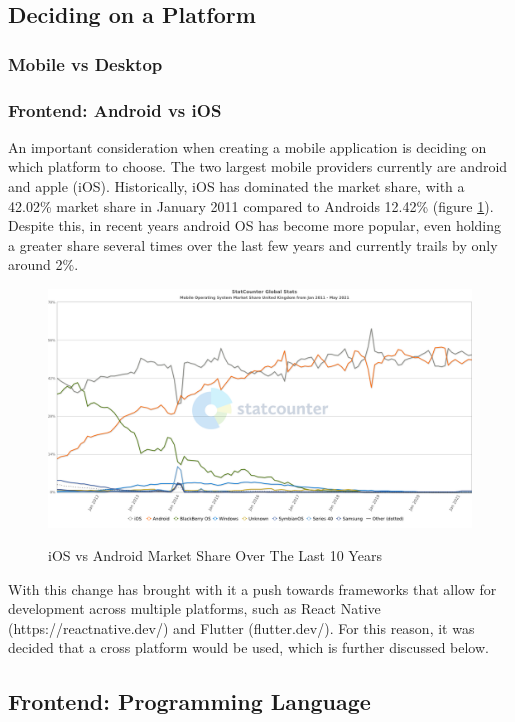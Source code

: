 \documentclass[12pt]{article}
\begin{document}
	\subsection{Deciding on a Platform}
	\subsubsection{Mobile vs Desktop}
	
	\subsubsection{Frontend: Android vs iOS}
	An important consideration when creating a mobile application is deciding on which platform to choose. The two largest mobile providers currently are android and apple (iOS). Historically, iOS has dominated the market share, with a 42.02\% market share in January 2011 compared to Androids 12.42\% (figure \ref{fig:ios-android}). Despite this, in recent years android OS has become more popular, even holding a greater share several times over the last few years and currently trails by only around 2\%.
	
	\begin{figure}[H]
		\centering
		\includegraphics[scale=0.4]{images/ios-android.png}
		\caption{iOS vs Android Market Share Over The Last 10 Years}
		\label{fig:ios-android}
		\cite{stat-counter-21}
	\end{figure}
	
	With this change has brought with it a push towards frameworks that allow for development across multiple platforms, such as React Native (https://reactnative.dev/) and Flutter (flutter.dev/). For this reason, it was decided that a cross platform would be used, which is further discussed below.
	
	\subsection{Frontend: Programming Language}
\end{document}
